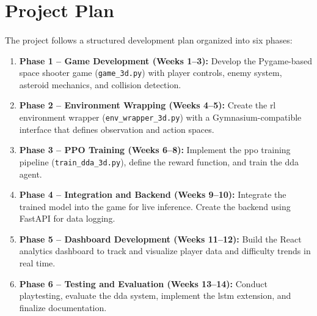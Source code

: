 \section{Project Plan}
\paragraph{} The project follows a structured development plan organized into six phases:

\begin{enumerate}
	\item \textbf{Phase 1 -- Game Development (Weeks 1--3):} Develop the Pygame-based space shooter game (\texttt{game\_3d.py}) with player controls, enemy system, asteroid mechanics, and collision detection.
	\item \textbf{Phase 2 -- Environment Wrapping (Weeks 4--5):} Create the \ac{rl} environment wrapper (\texttt{env\_wrapper\_3d.py}) with a Gymnasium-compatible interface that defines observation and action spaces.
	\item \textbf{Phase 3 -- PPO Training (Weeks 6--8):} Implement the \ac{ppo} training pipeline (\texttt{train\_dda\_3d.py}), define the reward function, and train the \ac{dda} agent.
	\item \textbf{Phase 4 -- Integration and Backend (Weeks 9--10):} Integrate the trained model into the game for live inference. Create the backend using FastAPI for data logging.
	\item \textbf{Phase 5 -- Dashboard Development (Weeks 11--12):} Build the React analytics dashboard to track and visualize player data and difficulty trends in real time.
	\item \textbf{Phase 6 -- Testing and Evaluation (Weeks 13--14):} Conduct playtesting, evaluate the \ac{dda} system, implement the \ac{lstm} extension, and finalize documentation.
\end{enumerate}

